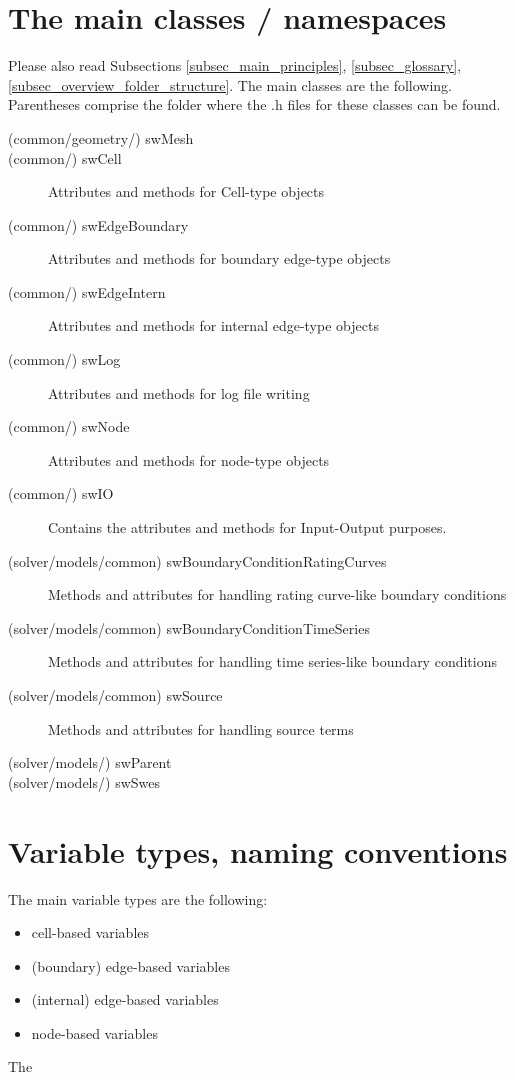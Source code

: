 \section{The main classes / namespaces}
Please also read Subsections \ref{subsec_main_principles}, \ref{subsec_glossary}, \ref{subsec_overview_folder_structure}.
The main classes are the following. Parentheses comprise the folder where the .h files for these classes can be found.
\begin{description}
\item[(common/geometry/) swMesh]
\item [(common/) swCell] Attributes and methods for Cell-type objects
\item [(common/) swEdgeBoundary] Attributes and methods for boundary edge-type objects
\item [(common/) swEdgeIntern] Attributes and methods for internal edge-type objects
\item [(common/) swLog] Attributes and methods for log file writing
\item [(common/) swNode] Attributes and methods for node-type objects
\item [(common/) swIO] Contains the attributes and methods for Input-Output purposes.
\item [(solver/models/common) swBoundaryConditionRatingCurves] Methods and attributes for handling rating curve-like boundary conditions
\item [(solver/models/common) swBoundaryConditionTimeSeries] Methods and attributes for handling time series-like boundary conditions
\item [(solver/models/common) swSource] Methods and attributes for handling source terms
\item [(solver/models/) swParent]
\item [(solver/models/) swSwes]
\end{description}
\section{Variable types, naming conventions}
The main variable types are the following:
\begin{itemize}
\item cell-based variables
\item (boundary) edge-based variables
\item (internal) edge-based variables
\item node-based variables
\end{itemize}
The 
